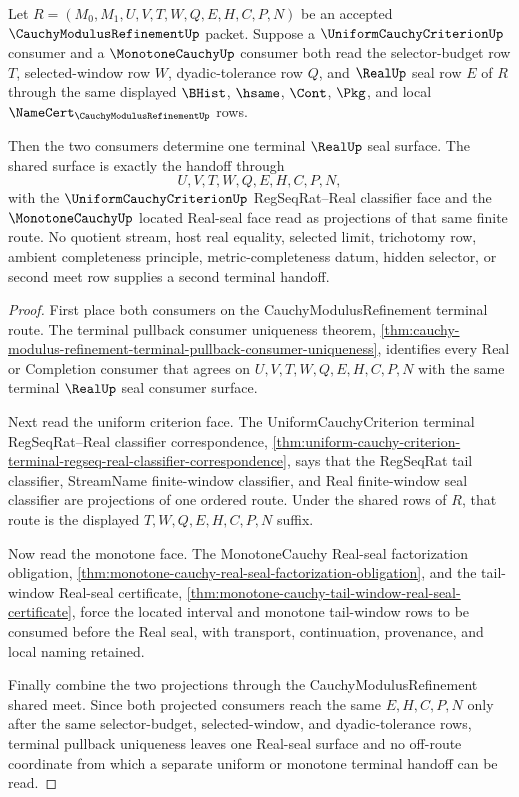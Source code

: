 \begin{theorem}
\label{thm:cauchy-modulus-refinement-uniform-monotone-terminal-route}
Let $R=(M_0,M_1,U,V,T,W,Q,E,H,C,P,N)$ be an accepted $\CauchyModulusRefinementUp$ packet. Suppose a $\UniformCauchyCriterionUp$ consumer and a $\MonotoneCauchyUp$ consumer both read the selector-budget row $T$, selected-window row $W$, dyadic-tolerance row $Q$, and $\RealUp$ seal row $E$ of $R$ through the same displayed $\BHist$, $\hsame$, $\Cont$, $\Pkg$, and local $\NameCert_{\CauchyModulusRefinementUp}$ rows.

Then the two consumers determine one terminal $\RealUp$ seal surface. The shared surface is exactly the handoff through
$$
U,V,T,W,Q,E,H,C,P,N,
$$
with the $\UniformCauchyCriterionUp$ RegSeqRat--Real classifier face and the $\MonotoneCauchyUp$ located Real-seal face read as projections of that same finite route. No quotient stream, host real equality, selected limit, trichotomy row, ambient completeness principle, metric-completeness datum, hidden selector, or second meet row supplies a second terminal handoff.
\end{theorem}
\begin{proof}
First place both consumers on the CauchyModulusRefinement terminal route. The terminal pullback consumer uniqueness theorem, \autoref{thm:cauchy-modulus-refinement-terminal-pullback-consumer-uniqueness}, identifies every Real or Completion consumer that agrees on $U,V,T,W,Q,E,H,C,P,N$ with the same terminal $\RealUp$ seal consumer surface.

Next read the uniform criterion face. The UniformCauchyCriterion terminal RegSeqRat--Real classifier correspondence, \autoref{thm:uniform-cauchy-criterion-terminal-regseq-real-classifier-correspondence}, says that the RegSeqRat tail classifier, StreamName finite-window classifier, and Real finite-window seal classifier are projections of one ordered route. Under the shared rows of $R$, that route is the displayed $T,W,Q,E,H,C,P,N$ suffix.

Now read the monotone face. The MonotoneCauchy Real-seal factorization obligation, \autoref{thm:monotone-cauchy-real-seal-factorization-obligation}, and the tail-window Real-seal certificate, \autoref{thm:monotone-cauchy-tail-window-real-seal-certificate}, force the located interval and monotone tail-window rows to be consumed before the Real seal, with transport, continuation, provenance, and local naming retained.

Finally combine the two projections through the CauchyModulusRefinement shared meet. Since both projected consumers reach the same $E,H,C,P,N$ only after the same selector-budget, selected-window, and dyadic-tolerance rows, terminal pullback uniqueness leaves one Real-seal surface and no off-route coordinate from which a separate uniform or monotone terminal handoff can be read.
\end{proof}

